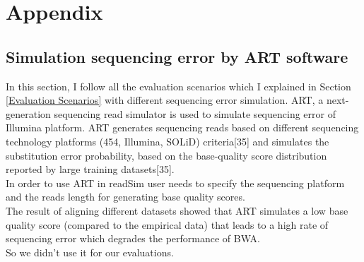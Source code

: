 \documentclass[11pt,a4paper]{report}
\begin{document}

\newpage
\appendix
\section*{Appendix}
\renewcommand{\thesubsection}{\Alph{subsection}}

\subsection{Simulation sequencing error by ART software} 
\label{Simulation sequencing error by ART software}

In this section, I follow all the evaluation scenarios which I explained in
Section \ref{Evaluation Scenarios}  with different sequencing error simulation.
ART, a next-generation sequencing read simulator is used to simulate sequencing
error of Illumina platform. 
ART generates sequencing reads based on different sequencing technology 
platforms (454, Illumina, SOLiD) criteria[35] and simulates the
substitution error probability, based on the base-quality 
score distribution reported by large training datasets[35].\\

In order to use ART in readSim user needs to specify the sequencing
platform and the reads length for generating base quality scores.\\

The result of aligning different datasets showed that ART simulates a
low base quality score (compared to the empirical data) that leads to 
a high rate of sequencing error which degrades the performance of BWA.\\

So we didn't use it for our evaluations. \\
\end{document}
